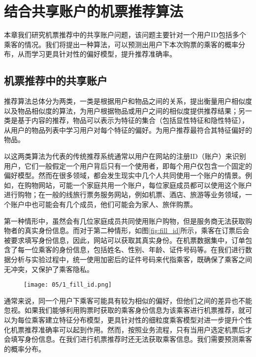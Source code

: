 
\chapter{结合共享账户的机票推荐算法}
\label{chap:share}

本章我们研究机票推荐中的共享账户问题，该问题主要针对一个用户ID包括多个乘客的情况。我们将提出一种算法，可以预测出用户下本次购票的乘客的概率分布，从而学习更具针对性的偏好模型，提升推荐准确率。

\section{机票推荐中的共享账户}

推荐算法总体分为两类，一类是根据用户和物品之间的关系，提出衡量用户相似度以及物品相似度的算法，为用户根据物品或用户之间的相似度提供推荐结果；另一类是基于内容的推荐，物品可以表示为特征的集合（包括显性特征和隐性特征），从用户的物品列表中学习用户对每个特征的偏好。为用户推荐最符合其特征偏好的物品。

以这两类算法为代表的传统推荐系统通常以用户在网站的注册ID（账户）来识别用户，它们一般假定一个用户背后只有一个使用者，即每个用户仅包含一个固定的偏好模型。然而在很多领域，都会发生现实中几个人共同使用一个账户的情景。例如，在购物网站，可能一个家庭共用一个账户，每位家庭成员都可以使用这个账户进行购物；在一般的线旅行票务服务网站，例如机票、酒店、旅游等业务领域，一个账户中也可能会有几个成员，他们可能会为家人、旅伴购票。


第一种情形中，虽然会有几位家庭成员共同使用账户购物，但是服务商无法获取购物者的真实身份信息。而对于第二种情形，如图\ref{fig:fill_id}所示，乘客在订票后会被要求填写身份信息，因此，网站可以获取其真实身份。在机票数据集中，订单包含了每一位乘客的身份信息，包括姓名、性别、年龄、证件号码等。在我们进行数据分析与实验过程中，统一使用加密后的证件号码来代指乘客，既确保了乘客之间无冲突，又保护了乘客隐私。

\begin{figure}
 \centering
 \texttt{[image: 05/1\_fill\_id.png]}
\end{figure}

通常来说，同一个用户下乘客可能具有较为相似的偏好，但他们之间的差异也不能忽视。如果我们能够利用购票时获取的乘客身份信息为该乘客进行机票推荐，就可以为每位乘客建立特征分布模型，更具针对性的细粒度乘客模型对进一步提升个性化机票推荐准确率可以起到作用。然而，按照业务流程，只有当用户选定机票后才会填写身份信息。在我们进行机票推荐时还无法获取乘客信息。我们需要预测乘客的概率分布。

